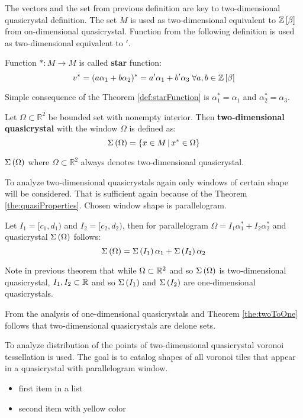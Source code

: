 \documentclass[text.tex]{subfiles}
\begin{document}
\begin{remark}
The vectors and the set from previous definition are key to two-dimensional quasicrystal definition. The set $M$ is used as two-dimensional equivalent to $\mathbb{Z}\left[\beta\right]$ from on-dimensional quasicrystal. Function from the following definition is used as two-dimensional equivalent to $'$.
\end{remark}

\begin{definition}
\label{def:starFunction}
Function $\ast: M \to M$ is called \textbf{star} function:
$$v^\ast = (a\alpha_1 + b\alpha_2)^\ast = a'\alpha_1 + b'\alpha_3 \;\forall a,b\in\mathbb{Z}\left[\beta\right]$$
\end{definition}

\begin{remark}
Simple consequence of the Theorem \ref{def:starFunction} is $\alpha_1^\ast = \alpha_1$ and $\alpha_2^\ast = \alpha_3$.
\end{remark}

\begin{definition}
Let $\Omega \subset \mathbb{R}^2$ be bounded set with nonempty interior. Then \textbf{two-dimensional quasicrystal} with the window $\Omega$ is defined as:
$$\Sigma\left(\Omega\right) = \left\{ x \in M\,|\,x^\ast \in \Omega \right\}$$
\end{definition}

\begin{remark}
$\Sigma\left(\Omega\right)$ where $\Omega \subset \mathbb{R}^2$ always denotes two-dimensional quasicrystal.
\end{remark}

To analyze two-dimensional quasicrystals again only windows of certain shape will be considered. That is sufficient again because of the Theorem \ref{the:quasiProperties}. Chosen window shape is parallelogram. 

\begin{theorem}
\label{the:twoToOne}
Let $I_1 = [c_1,d_1)$ and $I_2 = [c_2,d_2)$, then for parallelogram $\Omega = I_1\alpha_1^\ast + I_2\alpha_2^\ast$ and quasicrystal $\Sigma\left(\Omega\right)$ follows: 
$$\Sigma\left(\Omega\right) = \Sigma\left(I_1\right)\alpha_1 + \Sigma\left(I_2\right)\alpha_2$$
\end{theorem}

\begin{remark}
Note in previous theorem that while $\Omega \subset \mathbb{R}^2$ and so $\Sigma\left(\Omega\right)$ is two-dimensional quasicrystal, $I_1, I_2 \subset \mathbb{R}$ and so $\Sigma\left(I_1\right)$ and $\Sigma\left(I_2\right)$ are one-dimensional quasicrystals.
\end{remark}

From the analysis of one-dimensional quasicrystals and Theorem \ref{the:twoToOne} follows that two-dimensional quasicrystals are delone sets.  

To analyze distribution of the points of two-dimensional quasicrystal voronoi tessellation is used. The goal is to catalog shapes of all voronoi tiles that appear in a quasicrystal with parallelogram window. 

\begin{itemize}
\item first item in a list
\item second item with yellow color
\end{itemize}
\end{document}
